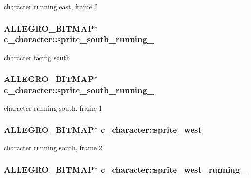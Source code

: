 character running east, frame 2 \hypertarget{classc__character_af5df98de273f4561fcdc2a51f209ffec}{
\subsubsection[{sprite\-\_\-south\-\_\-running\-\_\-1}]{\setlength{\rightskip}{0pt plus 5cm}A\-L\-L\-E\-G\-R\-O\-\_\-\-B\-I\-T\-M\-A\-P$\ast$ c\-\_\-character\-::sprite\-\_\-south\-\_\-running\-\_\hspace{0.3cm}{\ttfamily [protected]}}}\label{classc__character_af5df98de273f4561fcdc2a51f209ffec}
character facing south \hypertarget{classc__character_a5d3bd19c0e6ebe9e6bf656c33ace7577}{
\subsubsection[{sprite\-\_\-south\-\_\-running\-\_\-2}]{\setlength{\rightskip}{0pt plus 5cm}A\-L\-L\-E\-G\-R\-O\-\_\-\-B\-I\-T\-M\-A\-P$\ast$ c\-\_\-character\-::sprite\-\_\-south\-\_\-running\-\_\hspace{0.3cm}{\ttfamily [protected]}}}\label{classc__character_a5d3bd19c0e6ebe9e6bf656c33ace7577}
character running south. frame 1 \hypertarget{classc__character_a2f6f83ee5580e3d89e2170072353001e}{
\subsubsection[{sprite\-\_\-west}]{\setlength{\rightskip}{0pt plus 5cm}A\-L\-L\-E\-G\-R\-O\-\_\-\-B\-I\-T\-M\-A\-P$\ast$ c\-\_\-character\-::sprite\-\_\-west\hspace{0.3cm}{\ttfamily [protected]}}}\label{classc__character_a2f6f83ee5580e3d89e2170072353001e}
character running south, frame 2 \hypertarget{classc__character_a3429225d2f84f44e9f3af4236e6dd731}{
\subsubsection[{sprite\-\_\-west\-\_\-running\-\_\-1}]{\setlength{\rightskip}{0pt plus 5cm}A\-L\-L\-E\-G\-R\-O\-\_\-\-B\-I\-T\-M\-A\-P$\ast$ c\-\_\-character\-::sprite\-\_\-west\-\_\-running\-\_\hspace{0.3cm}{\ttfamily [protected]}}}\label{classc__character_a3429225d2f84f44e9f3af4236e6dd731}

